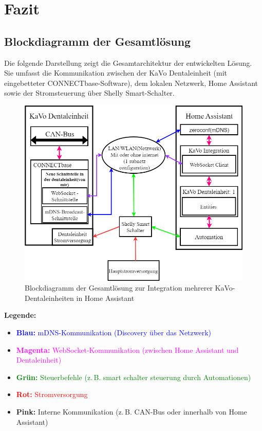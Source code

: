 \section{Fazit}

\subsection{Blockdiagramm der Gesamtlösung}
Die folgende Darstellung zeigt die Gesamtarchitektur der entwickelten Lösung. Sie umfasst die Kommunikation zwischen der KaVo Dentaleinheit (mit eingebetteter CONNECTbase-Software), dem lokalen Netzwerk, Home Assistant sowie der Stromsteuerung über Shelly Smart-Schalter.
\vspace{1cm}
\begin{figure}[H]
    \centering
    \includegraphics[width=\linewidth]{images/gesamtdiagram.drawio.png}
    \caption{Blockdiagramm der Gesamtlösung zur Integration mehrerer KaVo-Dentaleinheiten in Home Assistant}
    \label{fig:gesamtdiagramm}
\end{figure}

\textbf{Legende:}
\begin{itemize}
    \item \textcolor{blue}{\textbf{Blau:} mDNS-Kommunikation (Discovery über das Netzwerk)}
    \item \textcolor{magenta}{\textbf{Magenta:} WebSocket-Kommunikation (zwischen Home Assistant und Dentaleinheit)}
    \item \textcolor{green}{\textbf{Grün:} Steuerbefehle (z.\,B. smart schalter steuerung durch Automationen)}
    \item \textcolor{red}{\textbf{Rot:} Stromversorgung}
    \item \textcolor{strongpink}{\textbf{Pink:} Interne Kommunikation (z.\,B. CAN-Bus oder innerhalb von Home Assistant)}
\end{itemize}

